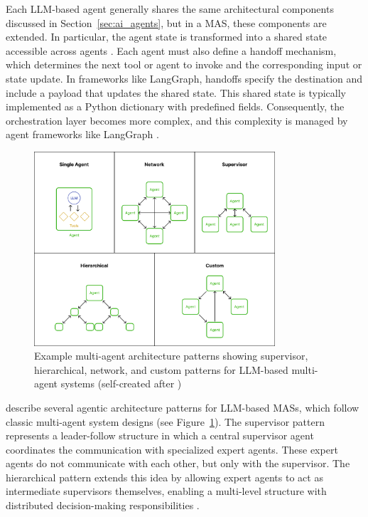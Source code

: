 \documentclass[a4paper,oneside,bibliography=totoc]{scrbook}
\begin{document}
Each \ac{LLM}-based agent generally shares the same architectural components discussed in Section~\ref{sec:ai_agents}, but in a \ac{MAS}, these components are extended. In particular, the agent state is transformed into a shared state accessible across agents \cite{Sapkota2025}. Each agent must also define a handoff mechanism, which determines the next tool or agent to invoke and the corresponding input or state update. In frameworks like LangGraph, handoffs specify the destination and include a payload that updates the shared state. This shared state is typically implemented as a Python dictionary with predefined fields. Consequently, the orchestration layer becomes more complex, and this complexity is managed by agent frameworks like LangGraph \cite{LangChain2025b}.

\begin{figure}[t]
  \centering
  \includegraphics[width=0.8\textwidth]{figures/Multi-agent architectures.png}
  \caption[Example multi-agent architecture patterns showing supervisor, hierarchical, network, and custom patterns for LLM-based multi-agent systems]{Example multi-agent architecture patterns showing supervisor, hierarchical, network, and custom patterns for LLM-based multi-agent systems (self-created after \cite{LangChain2025b})}
  \label{fig:mas_architecture}
\end{figure}

\citet{LangChain2025b} describe several agentic architecture patterns for \ac{LLM}-based \acp{MAS}, which follow classic multi-agent system designs (see Figure~\ref{fig:mas_architecture}). The supervisor pattern represents a leader-follow structure in which a central supervisor agent coordinates the communication with specialized expert agents. These expert agents do not communicate with each other, but only with the supervisor. The hierarchical pattern extends this idea by allowing expert agents to act as intermediate supervisors themselves, enabling a multi-level structure with distributed decision-making responsibilities \cite{LangChain2025b}.
\end{document}
